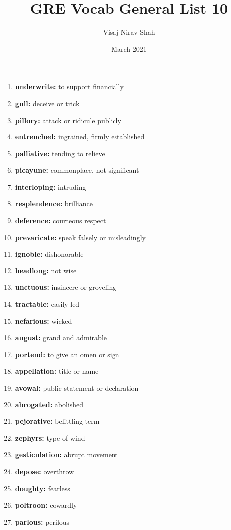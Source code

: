 \documentclass{article}
\title{\textbf{GRE Vocab General List 10}}
\author{Visaj Nirav Shah}
\date{March 2021}
\begin{document}
\maketitle

\begin{enumerate}
    \item \textbf{underwrite: }{to support financially}
    \item \textbf{gull: }{deceive or trick}
    \item \textbf{pillory: }{attack or ridicule publicly}
    \item \textbf{entrenched: }{ingrained, firmly established}
    \item \textbf{palliative: }{tending to relieve}
    \item \textbf{picayune: }{commonplace, not significant}
    \item \textbf{interloping: }{intruding}
    \item \textbf{resplendence: }{brilliance}
    \item \textbf{deference: }{courteous respect}
    \item \textbf{prevaricate: }{speak falsely or misleadingly}
    \item \textbf{ignoble: }{dishonorable}
    \item \textbf{headlong: }{not wise}
    \item \textbf{unctuous: }{insincere or groveling}
    \item \textbf{tractable: }{easily led}
    \item \textbf{nefarious: }{wicked}
    \item \textbf{august: }{grand and admirable}
    \item \textbf{portend: }{to give an omen or sign}
    \item \textbf{appellation: }{title or name}
    \item \textbf{avowal: }{public statement or declaration}
    \item \textbf{abrogated: }{abolished}
    \item \textbf{pejorative: }{belittling term}
    \item \textbf{zephyrs: }{type of wind}
    \item \textbf{gesticulation: }{abrupt movement}
    \item \textbf{depose: }{overthrow}
    \item \textbf{doughty: }{fearless}
    \item \textbf{poltroon: }{cowardly}
    \item \textbf{parlous: }{perilous}

\end{enumerate}
\end{document}
